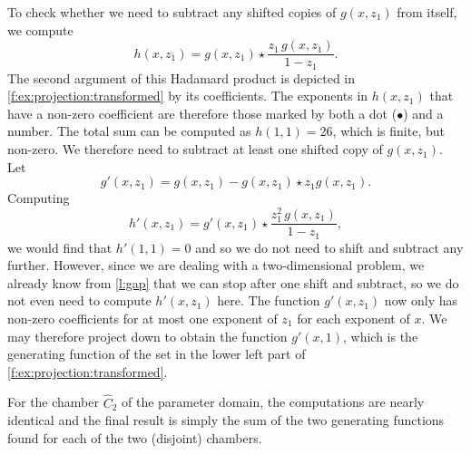 \begin{example}
To check whether we need to subtract any shifted copies of
$g(x,z_1)$ from itself, we compute
$$
h(x,z_1) = g(x,z_1) \star \frac{z_1 \, g(x,z_1)}{1-z_1}
.
$$
The second argument of this Hadamard product is depicted
in \autoref{f:ex:projection:transformed} by its coefficients.
The exponents in $h(x,z_1)$ that have a non-zero coefficient
are therefore those marked by both a dot ($\bullet$) and
a number.  The total sum can be computed as $h(1,1) = 26$,
which is finite, but non-zero.  We therefore need to subtract
at least one shifted copy of $g(x,z_1)$.
Let
$$
g'(x,z_1) = g(x,z_1) - g(x,z_1) \star z_1 g(x,z_1)
.
$$
Computing
$$
h'(x,z_1) = g'(x,z_1) \star \frac{z_1^2 \, g(x,z_1)}{1-z_1}
,
$$
we would find that $h'(1,1) = 0$ and so we do not need
to shift and subtract any further.
However, since we are dealing with a two-dimensional problem,
we already know from \autoref{l:gap} that we can stop
after one shift and subtract, so we do not even need
to compute $h'(x,z_1)$ here.
The function $g'(x,z_1)$ now only has non-zero coefficients
for at most one exponent of $z_1$ for each exponent of $x$.
We may therefore project down to obtain
the function $g'(x,1)$, which is the generating function
of the set in the lower left part of \autoref{f:ex:projection:transformed}.

For the chamber $\hat C_2$ of the parameter domain, the computations
are nearly identical and the final result is simply the sum
of the two generating functions found for each of the two (disjoint)
chambers.

\end{example}
